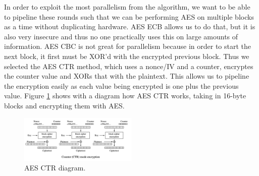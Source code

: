 In order to exploit the most parallelism from the algorithm, we want to be able to pipeline these rounds such that we can be performing AES on multiple blocks as a time without duplicating hardware. AES ECB allows us to do that, but it is also very insecure and thus no one practically uses this on large amounts of information. AES CBC is not great for parallelism because in order to start the next block, it first must be XOR'd with the encrypted previous block. Thus we selected the AES CTR method, which uses a nonce/IV and a counter, encryptes the counter value and XORs that with the plaintext. This allows us to pipeline the encryption easily as each value being encrypted is one plus the previous value. Figure \ref{fig:aesctr} shows with a diagram how AES CTR works, taking in 16-byte blocks and encrypting them with AES. 

\begin{figure}[h]
\centering
\includegraphics[width=0.5\textwidth]{aesctr}
\caption{AES CTR diagram.}
\label{fig:aesctr}
\end{figure}

